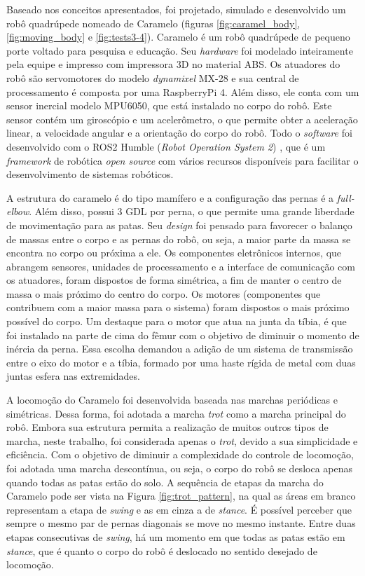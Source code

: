 \documentclass[../main.tex]{subfiles}
\begin{document}
Baseado nos conceitos apresentados, foi projetado, simulado e desenvolvido um robô quadrúpede nomeado de Caramelo (figuras \ref{fig:caramel_body}, \ref{fig:moving_body} e \ref{fig:tests3-4}). Caramelo é um robô quadrúpede de pequeno porte voltado para pesquisa e educação. Seu \textit{hardware} foi modelado inteiramente pela equipe e impresso com impressora 3D no material ABS. Os atuadores do robô são servomotores do modelo \textit{dynamixel} MX-28 e sua central de processamento é composta por uma RaspberryPi 4. Além disso, ele conta com um sensor inercial modelo MPU6050, que está instalado no corpo do robô. Este sensor contém um giroscópio e um acelerômetro, o que permite obter a aceleração linear, a velocidade angular e a orientação do corpo do robô. Todo o \textit{software} foi desenvolvido com o ROS2 Humble (\textit{Robot Operation System 2}) \cite{ROS2Humble}, que é um \textit{framework} de robótica \textit{open source} com vários recursos disponíveis para facilitar o desenvolvimento de sistemas robóticos.

A estrutura do caramelo é do tipo mamífero e a configuração das pernas é a \textit{full-elbow}. Além disso, possui 3 GDL por perna, o que permite uma grande liberdade de movimentação para as patas. Seu \textit{design} foi pensado para favorecer o balanço de massas entre o corpo e as pernas do robô, ou seja, a maior parte da massa se encontra no corpo ou próxima a ele. Os componentes eletrônicos internos, que abrangem sensores, unidades de processamento e a interface de comunicação com os atuadores, foram dispostos de forma simétrica, a fim de manter o centro de massa o mais próximo do centro do corpo. Os motores (componentes que contribuem com a maior massa para o sistema) foram dispostos o mais próximo possível do corpo. Um destaque para o motor que atua na junta da tíbia, é que foi instalado na parte de cima do fêmur com o objetivo de diminuir o momento de inércia da perna. Essa escolha demandou a adição de um sistema de transmissão entre o eixo do motor e a tíbia, formado por uma haste rígida de metal com duas juntas esfera nas extremidades.

A locomoção do Caramelo foi desenvolvida baseada nas marchas periódicas e simétricas. Dessa forma, foi adotada a marcha \textit{trot} como a marcha principal do robô. Embora sua estrutura permita a realização de muitos outros tipos de marcha, neste trabalho, foi considerada apenas o \textit{trot}, devido a sua simplicidade e eficiência. Com o objetivo de diminuir a complexidade do controle de locomoção, foi adotada uma marcha descontínua, ou seja, o corpo do robô se desloca apenas quando todas as patas estão do solo. A sequência de etapas da marcha do Caramelo pode ser vista na Figura \ref{fig:trot_pattern}, na qual as áreas em branco representam a etapa de \textit{swing} e as em cinza a de \textit{stance}. É possível perceber que sempre o mesmo par de pernas diagonais se move no mesmo instante. Entre duas etapas consecutivas de \textit{swing}, há um momento em que todas as patas estão em \textit{stance}, que é quanto o corpo do robô é deslocado no sentido desejado de locomoção.
\end{document}
